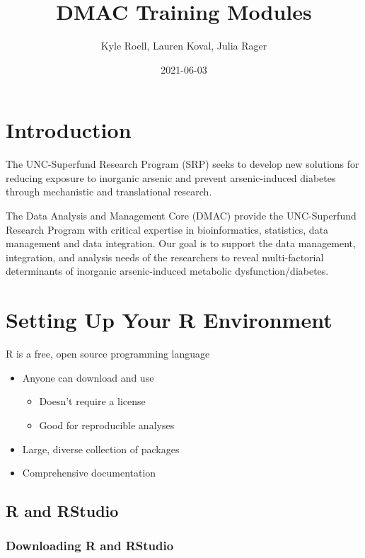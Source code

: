 \documentclass[
]{article}
\title{DMAC Training Modules}
\author{Kyle Roell, Lauren Koval, Julia Rager}
\date{2021-06-03}
\providecommand{\tightlist}{%
  \setlength{\itemsep}{0pt}\setlength{\parskip}{0pt}}
\begin{document}
\maketitle

{
\setcounter{tocdepth}{2}
\tableofcontents
}
\hypertarget{introduction}{%
\section{Introduction}\label{introduction}}

The UNC-Superfund Research Program (SRP) seeks to develop new solutions for reducing exposure to inorganic arsenic and prevent arsenic-induced diabetes through mechanistic and translational research.

The Data Analysis and Management Core (DMAC) provide the UNC-Superfund Research Program with critical expertise in bioinformatics, statistics, data management and data integration. Our goal is to support the data management, integration, and analysis needs of the researchers to reveal multi-factorial determinants of inorganic arsenic-induced metabolic dysfunction/diabetes.

\hypertarget{intro}{%
\section{Setting Up Your R Environment}\label{intro}}

R is a free, open source programming language

\begin{itemize}
\tightlist
\item
  Anyone can download and use

  \begin{itemize}
  \tightlist
  \item
    Doesn't require a license
  \item
    Good for reproducible analyses
  \end{itemize}
\item
  Large, diverse collection of packages
\item
  Comprehensive documentation
\end{itemize}

\hypertarget{r-and-rstudio}{%
\subsection{R and RStudio}\label{r-and-rstudio}}

\hypertarget{downloading-r-and-rstudio}{%
\subsubsection{Downloading R and RStudio}\label{downloading-r-and-rstudio}}
\end{document}
